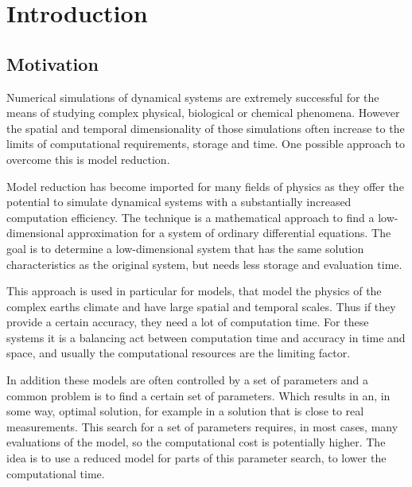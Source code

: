 
\chapter{Introduction} %

\label{Chapter1} %


\newcommand{\keyword}[1]{\textbf{#1}}
\newcommand{\tabhead}[1]{\textbf{#1}}
\newcommand{\code}[1]{\texttt{#1}}
\newcommand{\file}[1]{\texttt{\bfseries#1}}
\newcommand{\option}[1]{\texttt{\itshape#1}}


\section{Motivation}
Numerical simulations of dynamical systems are extremely successful for the means of studying complex physical, biological or chemical
phenomena. However the spatial and temporal dimensionality of those simulations often increase to the limits of computational requirements, storage and time.
One possible approach to overcome this is model reduction.

Model reduction has become imported for many fields of physics as they offer the potential to simulate dynamical systems with
a substantially increased computation efficiency. The technique is a mathematical approach to find a low-dimensional 
approximation for a system of ordinary differential equations. The goal is to determine a low-dimensional system that has the same
solution characteristics as the original system, but needs less storage and evaluation time.

This approach is used in particular for models, that model the physics of the complex earths climate 
and have large spatial and temporal scales. Thus if they provide a certain accuracy, they need a lot of computation time. 
For these systems it is a balancing act between computation time and accuracy in time and space, and
usually the computational resources are the limiting factor. 

In addition these models are often controlled by a
set of parameters and a common problem is to find a certain set of parameters. Which results in an, in some way, optimal solution,
for example in a solution that is close to real measurements. This search for a set of parameters requires, in most cases, many evaluations of the model, so
the computational cost is potentially higher. The idea is to use a reduced model for parts of this parameter search, to
lower the computational time.

